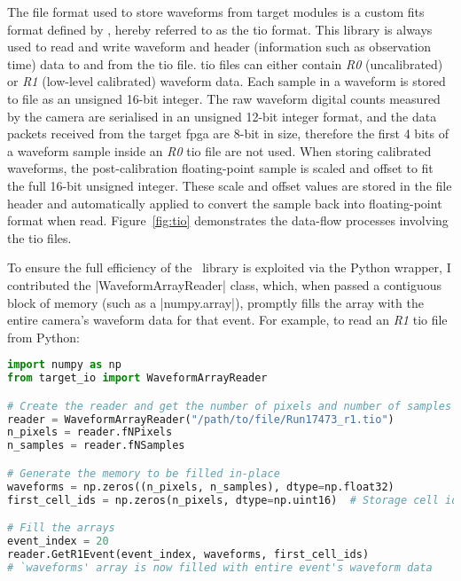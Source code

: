 The file format used to store waveforms from \gls{target} modules is a custom \gls{fits} format defined by , hereby referred to as the \gls{tio} format. This library is always used to read and write waveform and header (information such as observation time) data to and from the \gls{tio} file. \gls{tio} files can either contain \textit{R0} (uncalibrated)  or \textit{R1} (low-level calibrated) waveform data. Each sample in a waveform is stored to file as an unsigned 16-bit integer. The raw waveform digital counts measured by the camera are serialised in an unsigned 12-bit integer format, and the data packets received from the \gls{target} \gls{fpga} are 8-bit in size, therefore the first 4 bits of a waveform sample inside an \textit{R0} \gls{tio} file are not used. When storing calibrated waveforms, the post-calibration floating-point sample is scaled and offset to fit the full 16-bit unsigned integer. These scale and offset values are stored in the file header and automatically applied to convert the sample back into floating-point format when read. Figure~\ref{fig:tio} demonstrates the data-flow processes involving the \gls{tio} files.

To ensure the full efficiency of the \cpp~library is exploited via the Python wrapper, I contributed the |WaveformArrayReader| class, which, when passed a contiguous block of memory (such as a \lstset{language=Python}|numpy.array|), promptly fills the array with the entire camera's waveform data for that event. For example, to read an \textit{R1} \gls{tio} file from Python:

\begin{lstlisting}[language=Python]
import numpy as np
from target_io import WaveformArrayReader

# Create the reader and get the number of pixels and number of samples from the header
reader = WaveformArrayReader("/path/to/file/Run17473_r1.tio")
n_pixels = reader.fNPixels
n_samples = reader.fNSamples

# Generate the memory to be filled in-place
waveforms = np.zeros((n_pixels, n_samples), dtype=np.float32)
first_cell_ids = np.zeros(n_pixels, dtype=np.uint16)  # Storage cell id for the first sample of the event per pixel

# Fill the arrays
event_index = 20
reader.GetR1Event(event_index, waveforms, first_cell_ids)
# `waveforms' array is now filled with entire event's waveform data
\end{lstlisting}

\subsection{}

